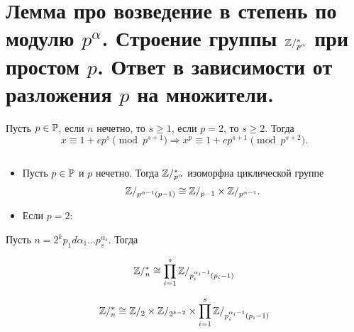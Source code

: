 % 
% 
\section{Лемма про возведение в степень по модулю $ p^{\alpha }$. Строение группы $ \mathbb{Z} / ^{*}_{ p^{\alpha }}$ при простом $ p$. Ответ в зависимости от разложения $ p$ на множители.}
\begin{lm}
    Пусть $ p \in \mathbb{P}$, если  $ n$ нечетно, то  $ s \ge 1$, если $ p =2$, то  $ s \ge 2$.
    Тогда 
    \[
	x  \equiv 1 + c p^{s} \pmod p^{s+1} \Longrightarrow x^{p} \equiv 1 + c p^{s+1} \pmod p^{s+2}
    .\] 
\end{lm}
\begin{st}

    $ $
    \begin{itemize}[noitemsep]
	\item
Пусть $ p \in \mathbb{P}$ и $ p$ нечетно. Тогда  $ \mathbb{Z} / ^* _{   p^{\alpha }}$ изоморфна циклической группе
\[
    \mathbb{Z} / _{ p^{\alpha -1} (p-1)} \cong \mathbb{Z} / _{   p-1} \times \mathbb{Z} / _{ p^{\alpha -1} } 
.\] 
\item
Если $ p = 2$:
    \end{itemize}
\end{st}
\begin{thm}
    Пусть $ n = 2^{k} p_1 d\alpha _1 \ldots p_s ^{ \alpha _s}$.  Тогда
    \begin{description}[noitemsep]
    \item[$ k = 0, 1$] 
	\[
	    \mathbb{Z} / ^{*} _{n} \cong \prod _{i=1}^{s} \mathbb{Z} / _{p_i^{\alpha _i - 1} (p_i - 1)}
	\] 
    \item[$ k \ge 2$] 
	\[
	    \mathbb{Z} /^{*}_{n} \cong \mathbb{Z} /_2 \times \mathbb{Z} / _{2^{k-2} } \times \prod_{i=1}^{s} \mathbb{Z} /_{p_i^{\alpha _i -1}(p_i-1)}
	\] 
    \end{description}
\end{thm}
% 
